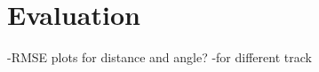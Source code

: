 
\section{Evaluation}\label{sec:evaluation}
-RMSE plots for distance and angle?
-for different track

